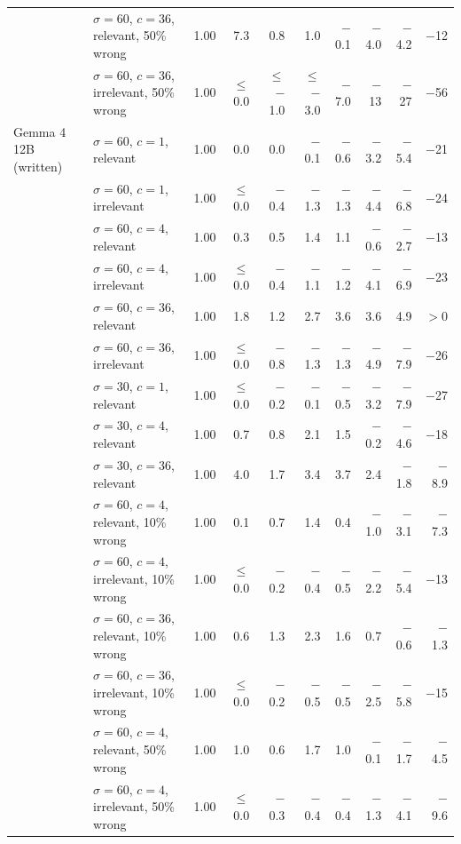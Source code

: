 \begin{tabular}{llrrrrrrrr}
 & $\sigma = 60$, $c = 36$, relevant, 50\% wrong & 1.00 & 7.3 & 0.8 & 1.0 & $-$0.1 & $-$4.0 & $-$4.2 & $-$12 \\
 & $\sigma = 60$, $c = 36$, irrelevant, 50\% wrong & 1.00 & $\leq$ 0.0 & $\leq$ $-$1.0 & $\leq$ $-$3.0 & $-$7.0 & $-$13 & $-$27 & $-$56 \\
\midrule
Gemma 4 12B (written) & $\sigma = 60$, $c = 1$, relevant & 1.00 & 0.0 & 0.0 & $-$0.1 & $-$0.6 & $-$3.2 & $-$5.4 & $-$21 \\
 & $\sigma = 60$, $c = 1$, irrelevant & 1.00 & $\leq$ 0.0 & $-$0.4 & $-$1.3 & $-$1.3 & $-$4.4 & $-$6.8 & $-$24 \\
 & $\sigma = 60$, $c = 4$, relevant & 1.00 & 0.3 & 0.5 & 1.4 & 1.1 & $-$0.6 & $-$2.7 & $-$13 \\
 & $\sigma = 60$, $c = 4$, irrelevant & 1.00 & $\leq$ 0.0 & $-$0.4 & $-$1.1 & $-$1.2 & $-$4.1 & $-$6.9 & $-$23 \\
 & $\sigma = 60$, $c = 36$, relevant & 1.00 & 1.8 & 1.2 & 2.7 & 3.6 & 3.6 & 4.9 & $> 0$ \\
 & $\sigma = 60$, $c = 36$, irrelevant & 1.00 & $\leq$ 0.0 & $-$0.8 & $-$1.3 & $-$1.3 & $-$4.9 & $-$7.9 & $-$26 \\
 & $\sigma = 30$, $c = 1$, relevant & 1.00 & $\leq$ 0.0 & $-$0.2 & $-$0.1 & $-$0.5 & $-$3.2 & $-$7.9 & $-$27 \\
 & $\sigma = 30$, $c = 4$, relevant & 1.00 & 0.7 & 0.8 & 2.1 & 1.5 & $-$0.2 & $-$4.6 & $-$18 \\
 & $\sigma = 30$, $c = 36$, relevant & 1.00 & 4.0 & 1.7 & 3.4 & 3.7 & 2.4 & $-$1.8 & $-$8.9 \\
 & $\sigma = 60$, $c = 4$, relevant, 10\% wrong & 1.00 & 0.1 & 0.7 & 1.4 & 0.4 & $-$1.0 & $-$3.1 & $-$7.3 \\
 & $\sigma = 60$, $c = 4$, irrelevant, 10\% wrong & 1.00 & $\leq$ 0.0 & $-$0.2 & $-$0.4 & $-$0.5 & $-$2.2 & $-$5.4 & $-$13 \\
 & $\sigma = 60$, $c = 36$, relevant, 10\% wrong & 1.00 & 0.6 & 1.3 & 2.3 & 1.6 & 0.7 & $-$0.6 & $-$1.3 \\
 & $\sigma = 60$, $c = 36$, irrelevant, 10\% wrong & 1.00 & $\leq$ 0.0 & $-$0.2 & $-$0.5 & $-$0.5 & $-$2.5 & $-$5.8 & $-$15 \\
 & $\sigma = 60$, $c = 4$, relevant, 50\% wrong & 1.00 & 1.0 & 0.6 & 1.7 & 1.0 & $-$0.1 & $-$1.7 & $-$4.5 \\
 & $\sigma = 60$, $c = 4$, irrelevant, 50\% wrong & 1.00 & $\leq$ 0.0 & $-$0.3 & $-$0.4 & $-$0.4 & $-$1.3 & $-$4.1 & $-$9.6 \\

\end{tabular}

